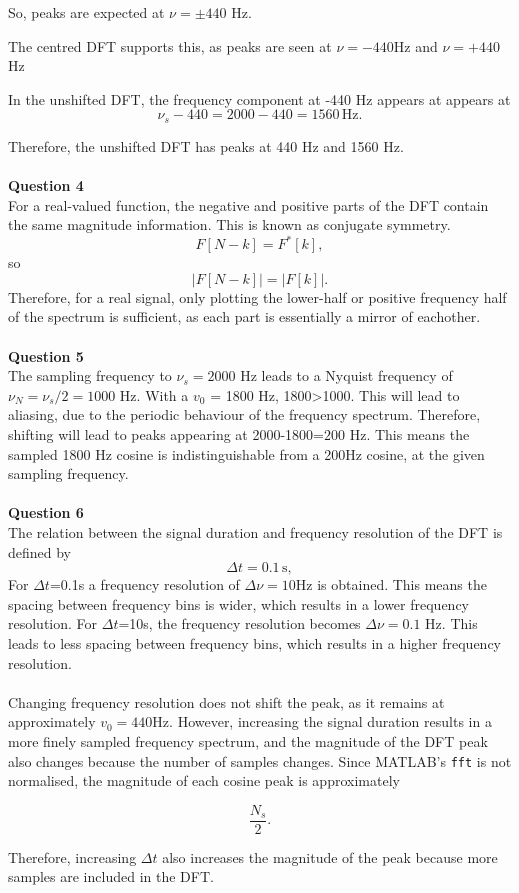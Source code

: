 So, peaks are expected at $\nu = \pm440$ Hz.

The centred DFT supports this, as peaks are seen at $\nu = -440$Hz and $\nu = +440$ Hz

In the unshifted DFT, the frequency component at -440 Hz appears at 
appears at
\[
\nu_s-440
=
2000-440
=
1560\,\mathrm{Hz}.
\]

Therefore, the unshifted DFT has peaks at 440 Hz and 1560 Hz.
\\
\\
\textbf{Question 4}
\\
For a real-valued function, the negative and positive parts of the DFT contain the same magnitude information. This is known as conjugate symmetry.
\[
F[N-k]=F^*[k],
\]
so
\[
|F[N-k]|=|F[k]|.
\]
Therefore, for a real signal, only plotting the lower-half or positive frequency  half of the spectrum is sufficient, as each part is essentially a mirror of eachother.
\\
\\
\textbf{Question 5}
\\
The sampling frequency to $\nu_s = 2000$ Hz leads to a Nyquist frequency of $\nu_N = \nu_s/2 = 1000$ Hz. With a $v_0$ = 1800 Hz, 1800>1000. This will lead to aliasing, due to the periodic behaviour of the frequency spectrum. Therefore, shifting will lead to peaks appearing at 2000-1800=$ 200$ Hz. This means the sampled 1800 Hz cosine is indistinguishable from a 200Hz cosine, at the given sampling frequency.
\\
\\
\textbf{Question 6}
\\
The relation between the signal duration and frequency resolution of the DFT is defined by
\[
\Delta t = 0.1\,\mathrm{s},
\]
For $\Delta t$=0.1s a frequency resolution of $\Delta\nu = 10$Hz is obtained. This means the spacing between frequency bins is wider, which results in a lower frequency resolution.
For $\Delta t$=10s, the frequency resolution becomes $\Delta\nu=0.1$ Hz. This leads to less spacing between frequency bins, which results in a higher frequency resolution.
\\
\\

Changing frequency resolution does not shift the peak, as it remains at approximately $v_0 = 440$Hz. However, increasing the signal duration results in a more finely sampled frequency spectrum, and the magnitude of the DFT peak also changes because the number of samples changes. Since MATLAB's \texttt{fft} is not normalised, the magnitude of each cosine peak is approximately

\[
\frac{N_s}{2}.
\]

Therefore, increasing $\Delta t$ also increases the magnitude of the peak because more samples are included in the DFT.
